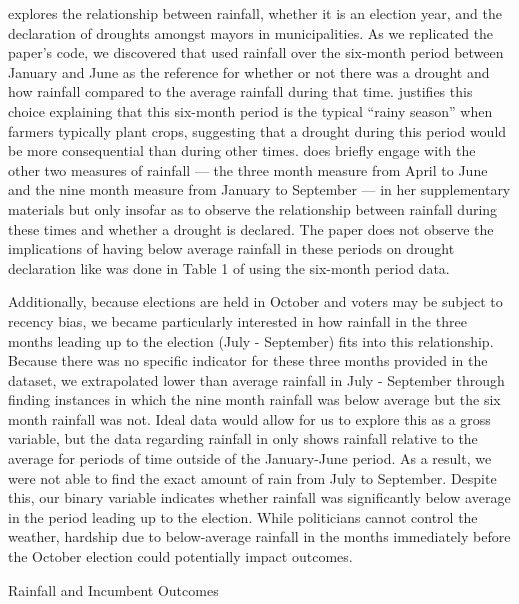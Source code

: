 \documentclass[12pt]{article}
\begin{document}
\citet{cooperman2021natural} explores the relationship between rainfall,
whether it is an election year, and the declaration of droughts amongst
mayors in municipalities. As we replicated the paper's code, we
discovered that \citet{cooperman2021natural} used rainfall over the
six-month period between January and June as the reference for whether
or not there was a drought and how rainfall compared to the average
rainfall during that time. \citet{cooperman2021natural} justifies this
choice explaining that this six-month period is the typical ``rainy
season'' when farmers typically plant crops, suggesting that a drought
during this period would be more consequential than during other times.
\citet{cooperman2021natural} does briefly engage with the other two
measures of rainfall --- the three month measure from April to June and
the nine month measure from January to September --- in her
supplementary materials but only insofar as to observe the relationship
between rainfall during these times and whether a drought is declared.
The paper does not observe the implications of having below average
rainfall in these periods on drought declaration like was done in Table
1 of \citet{cooperman2021natural} using the six-month period data.

Additionally, because elections are held in October and voters may be
subject to recency bias, we became particularly interested in how
rainfall in the three months leading up to the election (July -
September) fits into this relationship. Because there was no specific
indicator for these three months provided in the dataset, we
extrapolated lower than average rainfall in July - September through
finding instances in which the nine month rainfall was below average but
the six month rainfall was not. Ideal data would allow for us to explore
this as a gross variable, but the data regarding rainfall in
\citet{cooperman2021natural} only shows rainfall relative to the average
for periods of time outside of the January-June period. As a result, we
were not able to find the exact amount of rain from July to September.
Despite this, our binary variable indicates whether rainfall was
significantly below average in the period leading up to the election.
While politicians cannot control the weather, hardship due to
below-average rainfall in the months immediately before the October
election could potentially impact outcomes.

\begin{table}[]
  \caption{Rainfall and Incumbent Outcomes}
  
\end{table}
\end{document}
